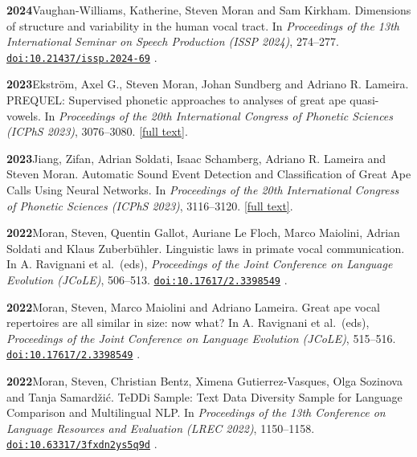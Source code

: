 \documentclass[11pt]{article}
\newcommand{\hangpara}{
 \setlength{\parindent}{0in} %
 \hangindent=0.42in %
}
\newcommand{\doi}[1]{%
  \href{https://doi.org/#1}{\nolinkurl{doi:#1}}%
}
\begin{document}
\vskip 6pt
\hangpara
{\bf 2024}\hspace{1ex}Vaughan-Williams, Katherine, Steven Moran and Sam Kirkham. Dimensions of structure and variability in the human vocal tract. In {\it Proceedings of the 13th International Seminar on Speech Production (ISSP 2024)}, 274--277. \doi{10.21437/issp.2024-69}.

\vskip 6pt
\hangpara
{\bf 2023}\hspace{1ex}Ekstr{\"o}m, Axel G., Steven Moran, Johan Sundberg and Adriano R. Lameira. PREQUEL: Supervised phonetic approaches to analyses of great ape quasi-vowels. In {\it Proceedings of the 20th International Congress of Phonetic Sciences (ICPhS 2023)}, 3076--3080. \href{https://www.internationalphoneticassociation.org/icphs-proceedings/ICPhS2023/full_papers/22.pdf}{[full text]}.

\vskip 6pt
\hangpara
{\bf 2023}\hspace{1ex}Jiang, Zifan, Adrian Soldati, Isaac Schamberg, Adriano R. Lameira and Steven Moran. Automatic Sound Event Detection and Classification of Great Ape Calls Using Neural Networks. In {\it Proceedings of the 20th International Congress of Phonetic Sciences (ICPhS 2023)}, 3116--3120. \href{https://www.internationalphoneticassociation.org/icphs-proceedings/ICPhS2023/full_papers/508.pdf}{[full text]}.

\vskip 6pt
\hangpara
{\bf 2022}\hspace{1ex}Moran, Steven, Quentin Gallot, Auriane Le Floch, Marco Maiolini, Adrian Soldati and Klaus Zuberbühler. Linguistic laws in primate vocal communication. In A. Ravignani et al.\ (eds), {\it Proceedings of the Joint Conference on Language Evolution (JCoLE)}, 506--513. \doi{10.17617/2.3398549}.

\vskip 6pt
\hangpara
{\bf 2022}\hspace{1ex}Moran, Steven, Marco Maiolini and Adriano Lameira. Great ape vocal repertoires are all similar in size: now what? In A. Ravignani et al.\ (eds), {\it Proceedings of the Joint Conference on Language Evolution (JCoLE)}, 515--516. \doi{10.17617/2.3398549}.

\vskip 6pt
\hangpara
{\bf 2022}\hspace{1ex}Moran, Steven, Christian Bentz, Ximena Gutierrez-Vasques, Olga Sozinova and Tanja Samardžić. TeDDi Sample: Text Data Diversity Sample for Language Comparison and Multilingual NLP. In {\it Proceedings of the 13th Conference on Language Resources and Evaluation (LREC 2022)}, 1150--1158. \doi{10.63317/3fxdn2ys5q9d}.%
\end{document}
